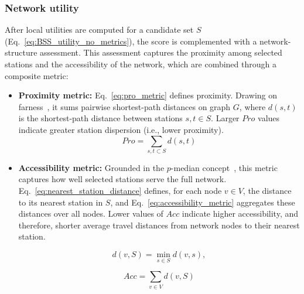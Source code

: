         \subsubsection{Network utility} \label{sec:section_network_utility}

        After local utilities are computed for a candidate set \(S\) (Eq.~\ref{eq:BSS_utility_no_metrics}), the score is complemented with a network-structure assessment. This assessment captures the proximity among selected stations and the accessibility of the network, which are combined through a composite metric:

        \begin{itemize}
            \item \textbf{Proximity metric:} Eq.~\ref{eq:pro_metric} defines proximity. Drawing on farness~\cite{Sabidussi1966}, it sums pairwise shortest-path distances on graph \(G\), where \(d(s,t)\) is the shortest-path distance between stations \(s,t \in S\). Larger \(Pro\) values indicate greater station dispersion (i.e., lower proximity).
              \begin{equation}\label{eq:pro_metric}
                  Pro = \sum_{{s,t} \subset S} d(s,t)
              \end{equation}
          
            \item \textbf{Accessibility metric:} Grounded in the $p$-median concept~\cite{Daskin2015, ReVelle2008}, this metric captures how well selected stations serve the full network. Eq.~\ref{eq:nearest_station_distance} defines, for each node \(v \in V\), the distance to its nearest station in \(S\), and Eq.~\ref{eq:accessibility_metric} aggregates these distances over all nodes. Lower values of $Acc$ indicate higher accessibility, and therefore, shorter average travel distances from network nodes to their nearest station.
          
              \begin{equation}\label{eq:nearest_station_distance}
                  d(v, S) = \min_{s \in S} d(v,s),
              \end{equation}
            
              \begin{equation}\label{eq:accessibility_metric}
                    Acc = \sum_{v \in V} d(v, S)
                \end{equation}
          
        \end{itemize}

